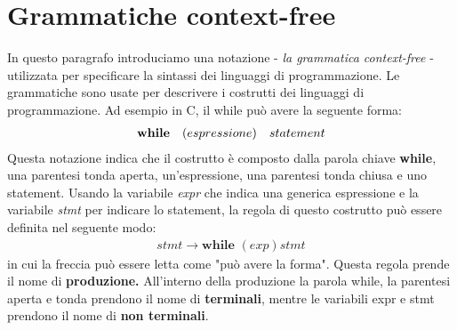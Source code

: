 \section{Grammatiche context-free}
In questo paragrafo introduciamo una notazione - \textit{la grammatica context-free} - utilizzata per specificare la sintassi dei linguaggi di programmazione. Le grammatiche sono usate per descrivere i costrutti dei linguaggi di programmazione. Ad esempio in C, il while può avere la seguente forma:
\begin{align}
	\textbf{while} \quad (espressione) \quad statement \notag
\end{align}
Questa notazione indica che il costrutto è composto dalla parola chiave \textbf{while}, una parentesi tonda aperta, un'espressione, una parentesi tonda chiusa e uno statement. Usando la variabile \textit{expr} che indica una generica espressione e la variabile \textit{stmt} per indicare lo statement, la regola di questo costrutto può essere definita nel seguente modo:
\begin{align}\label{regolaWhile}
	stmt \to \textbf{while } ( exp ) stmt 
\end{align}
in cui la freccia può essere letta come "può avere la forma". Questa regola prende il nome di \textbf{produzione. }All'interno della produzione la parola while, la parentesi aperta e tonda prendono il nome di \textbf{terminali}, mentre le variabili expr e stmt prendono il nome di \textbf{non terminali}.
